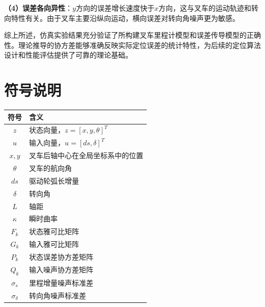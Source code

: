\documentclass[12pt,a4paper]{article}
\begin{document}
\textbf{（4）误差各向异性}：$y$方向的误差增长速度快于$x$方向，这与叉车的运动轨迹和转向特性有关。由于叉车主要沿纵向运动，横向误差对转向角噪声更为敏感。

综上所述，仿真实验结果充分验证了所构建叉车里程计模型和误差传导模型的正确性。理论推导的协方差能够准确反映实际定位误差的统计特性，为后续的定位算法设计和性能评估提供了可靠的理论基础。

\section*{符号说明}

\begin{table}[H]
\centering
\begin{tabular}{cl}
\toprule
符号 & 含义 \\
\midrule
$z$ & 状态向量，$z=[x,y,\theta]^T$ \\
$u$ & 输入向量，$u=[ds,\delta]^T$ \\
$x, y$ & 叉车后轴中心在全局坐标系中的位置 \\
$\theta$ & 叉车的航向角 \\
$ds$ & 驱动轮弧长增量 \\
$\delta$ & 转向角 \\
$L$ & 轴距 \\
$\kappa$ & 瞬时曲率 \\
$F_k$ & 状态雅可比矩阵 \\
$G_k$ & 输入雅可比矩阵 \\
$P_k$ & 状态误差协方差矩阵 \\
$Q_k$ & 输入噪声协方差矩阵 \\
$\sigma_s$ & 里程增量噪声标准差 \\
$\sigma_\delta$ & 转向角噪声标准差 \\
\bottomrule
\end{tabular}
\end{table}
\end{document}
